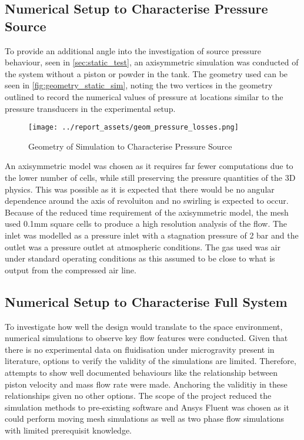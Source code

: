 \subsection{Numerical Setup to Characterise Pressure Source}
To provide an additional angle into the investigation of source pressure behaviour, seen in \autoref{sec:static_test}, an axisymmetric simulation was conducted of the system without a piston or powder in the tank. The geometry used can be seen in \autoref{fig:geometry_static_sim}, noting the two vertices in the geometry outlined to record the numerical values of pressure at locations similar to the pressure transducers in the experimental setup.
\begin{figure}[htbp]
    \centering
    
    \begin{minipage}{0.9\textwidth}
        \centering
        \texttt{[image: ../report\_assets/geom\_pressure\_losses.png]}
        \caption{Geometry of Simulation to Characterise Pressure Source}\label{fig:geometry_static_sim}
    \end{minipage}
    
\end{figure}
An axisymmetric model was chosen as it requires far fewer computations due to the lower number of cells, while still preserving the pressure quantities of the 3D physics. This was possible as it is expected that there would be no angular dependence around the axis of revoluiton and no swirling is expected to occur. Because of the reduced time requirement of the axisymmetric model, the mesh used 0.1mm square cells to produce a high resolution analysis of the flow. The inlet was modelled as a pressure inlet with a stagnation pressure of 2 bar and the outlet was a pressure outlet at atmospheric conditions. The gas used was air under standard operating conditions as this assumed to be close to what is output from the compressed air line.
\subsection{Numerical Setup to Characterise Full System}
To investigate how well the design would translate to the space environment, numerical simulations to observe key flow features were conducted. Given that there is no experimental data on fluidisation under microgravity present in literature, options to verify the validity of the simulations are limited. Therefore, attempts to show well documented behaviours like the relationship between piston velocity and mass flow rate were made. Anchoring the validitiy in these relationships given no other options. The scope of the project reduced the simulation methods to pre-existing software and Ansys Fluent was chosen as it could perform moving mesh simulations as well as two phase flow simulations with limited prerequisit knowledge.

